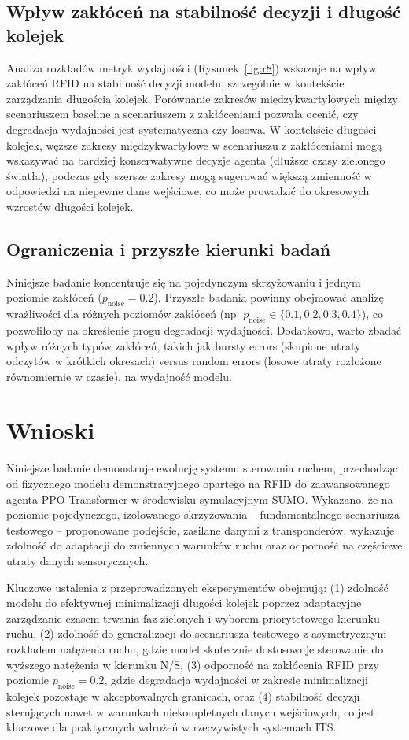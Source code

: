 \documentclass[12pt,a4paper]{article}
\begin{document}
\subsection{Wpływ zakłóceń na stabilność decyzji i długość kolejek}

Analiza rozkładów metryk wydajności (Rysunek~\ref{fig:r8}) wskazuje na wpływ zakłóceń RFID na stabilność decyzji modelu, szczególnie w kontekście zarządzania długością kolejek. Porównanie zakresów międzykwartylowych między scenariuszem baseline a scenariuszem z zakłóceniami pozwala ocenić, czy degradacja wydajności jest systematyczna czy losowa. W kontekście długości kolejek, węższe zakresy międzykwartylowe w scenariuszu z zakłóceniami mogą wskazywać na bardziej konserwatywne decyzje agenta (dłuższe czasy zielonego światła), podczas gdy szersze zakresy mogą sugerować większą zmienność w odpowiedzi na niepewne dane wejściowe, co może prowadzić do okresowych wzrostów długości kolejek.

\subsection{Ograniczenia i przyszłe kierunki badań}

Niniejsze badanie koncentruje się na pojedynczym skrzyżowaniu i jednym poziomie zakłóceń ($p_{\text{noise}} = 0.2$). Przyszłe badania powinny obejmować analizę wrażliwości dla różnych poziomów zakłóceń (np. $p_{\text{noise}} \in \{0.1, 0.2, 0.3, 0.4\}$), co pozwoliłoby na określenie progu degradacji wydajności. Dodatkowo, warto zbadać wpływ różnych typów zakłóceń, takich jak bursty errors (skupione utraty odczytów w krótkich okresach) versus random errors (losowe utraty rozłożone równomiernie w czasie), na wydajność modelu.

\section{Wnioski}

Niniejsze badanie demonstruje ewolucję systemu sterowania ruchem, przechodząc od fizycznego modelu demonstracyjnego opartego na RFID do zaawansowanego agenta PPO-Transformer w środowisku symulacyjnym SUMO. Wykazano, że na poziomie pojedynczego, izolowanego skrzyżowania -- fundamentalnego scenariusza testowego -- proponowane podejście, zasilane danymi z transponderów, wykazuje zdolność do adaptacji do zmiennych warunków ruchu oraz odporność na częściowe utraty danych sensorycznych.

Kluczowe ustalenia z przeprowadzonych eksperymentów obejmują: (1) zdolność modelu do efektywnej minimalizacji długości kolejek poprzez adaptacyjne zarządzanie czasem trwania faz zielonych i wyborem priorytetowego kierunku ruchu, (2) zdolność do generalizacji do scenariusza testowego z asymetrycznym rozkładem natężenia ruchu, gdzie model skutecznie dostosowuje sterowanie do wyższego natężenia w kierunku N/S, (3) odporność na zakłócenia RFID przy poziomie $p_{\text{noise}} = 0.2$, gdzie degradacja wydajności w zakresie minimalizacji kolejek pozostaje w akceptowalnych granicach, oraz (4) stabilność decyzji sterujących nawet w warunkach niekompletnych danych wejściowych, co jest kluczowe dla praktycznych wdrożeń w rzeczywistych systemach ITS.
\end{document}
